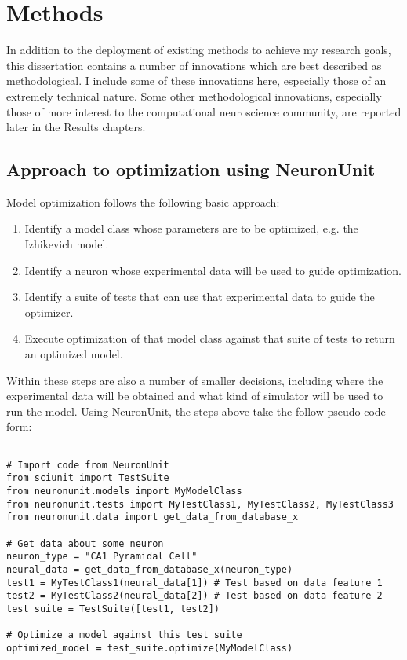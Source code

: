 \chapter{Methods}
In addition to the deployment of existing methods to achieve my research goals, this dissertation contains a number of innovations which are best described as methodological.  I include some of these innovations here, especially those of an extremely technical nature.  Some other methodological innovations, especially those of more interest to the computational neuroscience community, are reported later in the Results chapters.

\section{Approach to optimization using NeuronUnit}
Model optimization follows the following basic approach:
\begin{enumerate}
	\item Identify a model class whose parameters are to be optimized, e.g. the Izhikevich model.
	\item Identify a neuron whose experimental data will be used to guide optimization.
	\item Identify a suite of tests that can use that experimental data to guide the optimizer.
	\item Execute optimization of that model class against that suite of tests to return an optimized model.
\end{enumerate}
Within these steps are also a number of smaller decisions, including where the experimental data will be obtained and what kind of simulator will be used to run the model.
Using NeuronUnit, the steps above take the follow pseudo-code form:
\clearpage
\begin{verbatim}

# Import code from NeuronUnit
from sciunit import TestSuite
from neuronunit.models import MyModelClass
from neuronunit.tests import MyTestClass1, MyTestClass2, MyTestClass3
from neuronunit.data import get_data_from_database_x

# Get data about some neuron
neuron_type = "CA1 Pyramidal Cell"
neural_data = get_data_from_database_x(neuron_type)
test1 = MyTestClass1(neural_data[1]) # Test based on data feature 1
test2 = MyTestClass2(neural_data[2]) # Test based on data feature 2
test_suite = TestSuite([test1, test2])

# Optimize a model against this test suite
optimized_model = test_suite.optimize(MyModelClass)
\end{verbatim}

